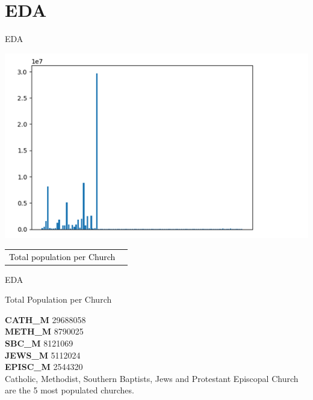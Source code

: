 \documentclass[12pt]{beamer}
\begin{document}
\section{EDA}
\begin{frame}{EDA}




\begin{center}
    \includegraphics[width=0.7\linewidth]{barplot.png}
    
    \vspace{1em}
    \begin{tabular}{ll}
      \textcolor{black}{ Total population per Church }\\

    \end{tabular}
\end{center}




\end{frame}



\begin{frame}{EDA}


Total Population per Church
\vspace{0.1cm}

 \textbf{CATH\_M}     29688058\\
 \textbf{METH\_M}     8790025\\
 \textbf{SBC\_M}      8121069\\
 \textbf{JEWS\_M}      5112024\\
 \textbf{EPISC\_M}    2544320\\

\vspace{0.4cm}
Catholic, Methodist, Southern Baptists, Jews and Protestant Episcopal 
Church are the 5 most populated churches. 






\end{frame}
\end{document}
